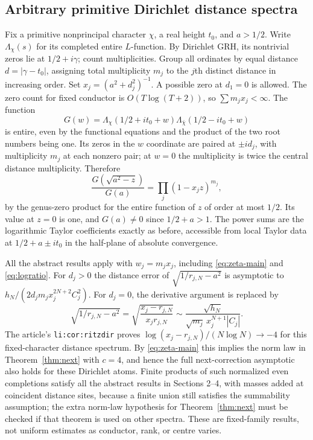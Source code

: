 \documentclass[11pt]{article}
\theoremstyle{remark}\newtheorem{remark}[theorem]{Remark}
\begin{document}
\subsection{Arbitrary primitive Dirichlet distance spectra}
Fix a primitive nonprincipal character $\chi$, a real height $t_0$, and $a>1/2$. Write $\Lambda_\chi(s)$ for its completed entire $L$-function. By Dirichlet GRH, its nontrivial zeros lie at $1/2+i\gamma$; count multiplicities. Group all ordinates by equal distance $d=|\gamma-t_0|$, assigning total multiplicity $m_j$ to the $j$th distinct distance in increasing order. Set $x_j=(a^2+d_j^2)^{-1}$. A possible zero at $d_1=0$ is allowed. The zero count for fixed conductor is $O(T\log(T+2))$, so $\sum m_jx_j<\infty$. The function
\[
 G(w)=\Lambda_\chi(1/2+it_0+w)\Lambda_{\bar\chi}(1/2-it_0+w)
\]
is entire, even by the functional equations and the product of the two root numbers being one. Its zeros in the $w$ coordinate are paired at $\pm id_j$, with multiplicity $m_j$ at each nonzero pair; at $w=0$ the multiplicity is twice the central distance multiplicity. Therefore
\[
 \frac{G(\sqrt{a^2-z})}{G(a)}=\prod_j(1-x_jz)^{m_j},
\]
by the genus-zero product for the entire function of $z$ of order at most $1/2$. Its value at $z=0$ is one, and $G(a)\ne0$ since $1/2+a>1$. The power sums are the logarithmic Taylor coefficients exactly as before, accessible from local Taylor data at $1/2+a\pm it_0$ in the half-plane of absolute convergence.

All the abstract results apply with $w_j=m_jx_j$, including \eqref{eq:zeta-main} and \eqref{eq:logratio}. For $d_j>0$ the distance error of $\sqrt{1/r_{j,N}-a^2}$ is asymptotic to $h_N/(2d_j m_jx_j^{2N+2}C_j^2)$. For $d_j=0$, the derivative argument is replaced by
\[
 \sqrt{1/r_{j,N}-a^2}=\sqrt{\frac{x_j-r_{j,N}}{x_jr_{j,N}}}\sim
 \frac{\sqrt{h_N}}{\sqrt{m_j}\,x_j^{N+1}|C_j|}.
\]
The article's \texttt{li:cor:ritzdir} proves $\log(x_j-r_{j,N})/(N\log N)\to-4$ for this fixed-character distance spectrum. By \eqref{eq:zeta-main} this implies the norm law in Theorem~\ref{thm:next} with $c=4$, and hence the full next-correction asymptotic also holds for these Dirichlet atoms. Finite products of such normalized even completions satisfy all the abstract results in Sections 2--4, with masses added at coincident distance sites, because a finite union still satisfies the summability assumption; the extra norm-law hypothesis for Theorem~\ref{thm:next} must be checked if that theorem is used on other spectra. These are fixed-family results, not uniform estimates as conductor, rank, or centre varies.
\end{document}
